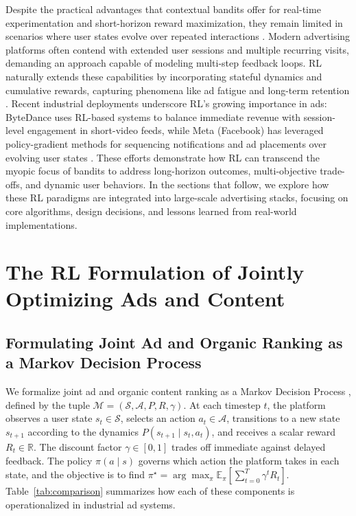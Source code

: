 \documentclass[manuscript,review,screen]{acmart}
\begin{document}
Despite the practical advantages that contextual bandits offer for real-time experimentation and short-horizon reward maximization, they remain limited in scenarios where user states evolve over repeated interactions \cite{Sutton1998}. Modern advertising platforms often contend with extended user sessions and multiple recurring visits, demanding an approach capable of modeling multi-step feedback loops. RL naturally extends these capabilities by incorporating stateful dynamics and cumulative rewards, capturing phenomena like ad fatigue \cite{ccelik2023ad} and long-term retention \cite{wu2017returning}. Recent industrial deployments underscore RL’s growing importance in ads: ByteDance uses RL-based systems \cite{zhao2020jointly, zhao2021dear} to balance immediate revenue with session-level engagement in short-video feeds, while Meta (Facebook) has leveraged policy-gradient methods for sequencing notifications and ad placements over evolving user states \cite{gauci2018horizon}. These efforts demonstrate how RL can transcend the myopic focus of bandits to address long-horizon outcomes, multi-objective trade-offs, and dynamic user behaviors. In the sections that follow, we explore how these RL paradigms are integrated into large-scale advertising stacks, focusing on core algorithms, design decisions, and lessons learned from real-world implementations.



\section{The RL Formulation of Jointly Optimizing Ads and Content}
\label{sec:rl-formulation}

\subsection{Formulating Joint Ad and Organic Ranking as a Markov Decision Process}
\label{subsec:mdp-formulation}

We formalize joint ad and organic content ranking as a Markov Decision Process \cite{puterman2014markov, Sutton1998}, defined by the tuple $\mathcal{M} = (\mathcal{S}, \mathcal{A}, P, R, \gamma)$. At each timestep $t$, the platform observes a user state $s_t \in \mathcal{S}$, selects an action $a_t \in \mathcal{A}$, transitions to a new state $s_{t+1}$ according to the dynamics $P(s_{t+1} \mid s_t, a_t)$, and receives a scalar reward $R_t \in \mathbb{R}$. The discount factor $\gamma \in [0,1]$ trades off immediate against delayed feedback. The policy $\pi(a \mid s)$ governs which action the platform takes in each state, and the objective is to find $\pi^\star = \arg\max_\pi \mathbb{E}_\pi\!\left[\sum_{t=0}^{T} \gamma^t R_t\right]$. Table~\ref{tab:comparison} summarizes how each of these components is operationalized in industrial ad systems.
\end{document}
